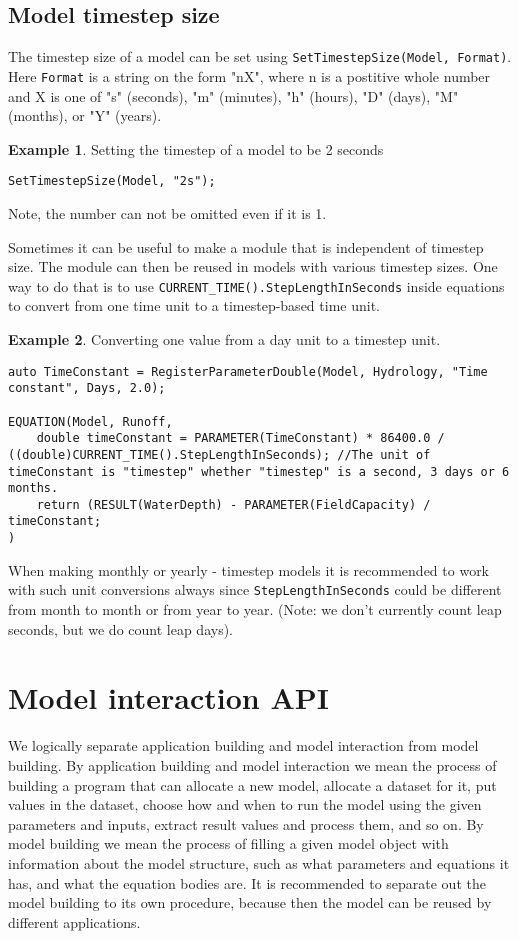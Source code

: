 \documentclass[11pt]{article}
\theoremstyle{definition}
\newtheorem{myexample}{Example}
\newenvironment{example}%
  {\begin{lrbox}{\examplebox}%
   \begin{minipage}{\dimexpr\linewidth-2\fboxsep}
   \begin{myexample}}%
  {\end{myexample}%
   \end{minipage}%
   \end{lrbox}%
   \begin{trivlist}
     \item[]\colorbox{silver}{\usebox\examplebox}
   \end{trivlist}}
\begin{document}
\subsection{Model timestep size}\label{sec:timestepsize}

The timestep size of a model can be set using {\tt SetTimestepSize(Model, Format)}. Here {\tt Format} is a string on the form "nX", where n is a postitive whole number and X is one of "s" (seconds), "m" (minutes), "h" (hours), "D" (days), "M" (months), or "Y" (years).
\begin{example}
Setting the timestep of a model to be 2 seconds
\begin{lstlisting}[style=mycpp]
SetTimestepSize(Model, "2s");
\end{lstlisting}
\end{example}
Note, the number can not be omitted even if it is 1.

Sometimes it can be useful to make a module that is independent of timestep size. The module can then be reused in models with various timestep sizes. One way to do that is to use {\tt CURRENT\_TIME().StepLengthInSeconds} inside equations to convert from one time unit to a timestep-based time unit.
\begin{example}
Converting one value from a day unit to a timestep unit.
\begin{lstlisting}[style=mycpp]
auto TimeConstant = RegisterParameterDouble(Model, Hydrology, "Time constant", Days, 2.0);

EQUATION(Model, Runoff,
	double timeConstant = PARAMETER(TimeConstant) * 86400.0 / ((double)CURRENT_TIME().StepLengthInSeconds); //The unit of timeConstant is "timestep" whether "timestep" is a second, 3 days or 6 months.
	return (RESULT(WaterDepth) - PARAMETER(FieldCapacity) / timeConstant;
)
\end{lstlisting}
\end{example}

When making monthly or yearly - timestep models it is recommended to work with such unit conversions always since {\tt StepLengthInSeconds} could be different from month to month or from year to year. (Note: we don't currently count leap seconds, but we do count leap days).

\section{Model interaction API}

We logically separate application building and model interaction from model building. By application building and model interaction we mean the process of building a program that can allocate a new model, allocate a dataset for it, put values in the dataset, choose how and when to run the model using the given parameters and inputs, extract result values and process them, and so on. By model building we mean the process of filling a given model object with information about the model structure, such as what parameters and equations it has, and what the equation bodies are. It is recommended to separate out the model building to its own procedure, because then the model can be reused by different applications.
\end{document}
